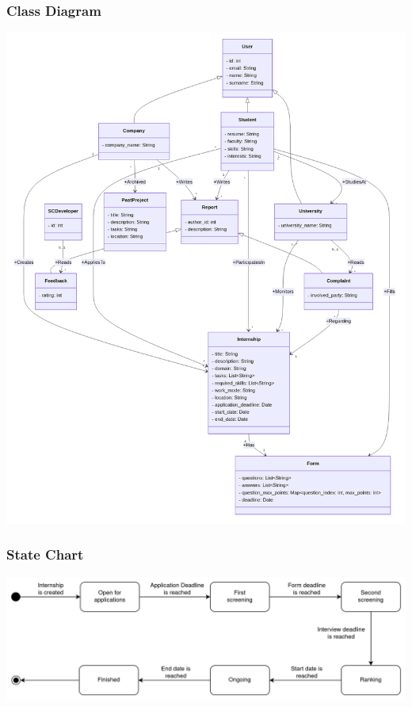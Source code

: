 \documentclass[11pt,twoside]{article}
\begin{document}
		\subsubsection{Class Diagram}
		\includegraphics[scale=0.55]{Images/Class_Diagram}
		\subsubsection{State Chart}
		\includegraphics[scale=0.185]{Images/Internship_state_diagram} \\
		
\end{document}

